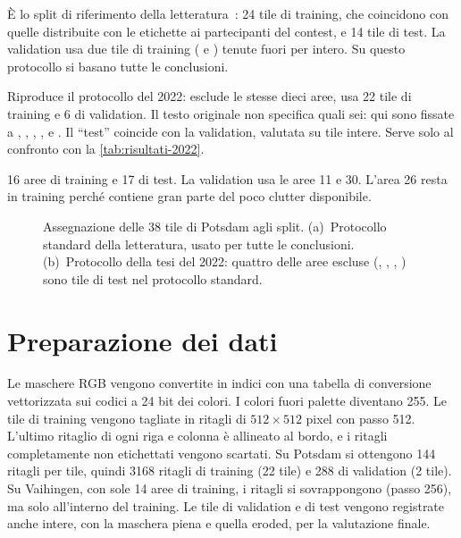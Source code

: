 \begin{description}[style=nextline, leftmargin=1.2em]
  \item[Potsdam \enquote{standard}.] È lo split di riferimento della
  letteratura~\cite{mmseg2020}: 24 tile di training, che coincidono con quelle distribuite con le
  etichette ai partecipanti del contest, e 14 tile di test. La validation usa due tile di
  training ( e ) tenute fuori per intero. Su questo protocollo si basano
  tutte le conclusioni.
  \item[Potsdam \enquote{tesi 2022}.] Riproduce il protocollo del 2022: esclude le stesse dieci
  aree, usa 22 tile di training e 6 di validation. Il testo originale non specifica quali sei:
  qui sono fissate a , , , ,  e
  . Il \enquote{test} coincide con la validation, valutata su tile intere. Serve solo
  al confronto con la \cref{tab:risultati-2022}.
  \item[Vaihingen \enquote{standard}.] 16 aree di training e 17 di test. La validation usa le
  aree 11 e 30. L'area 26 resta in training perché contiene gran parte del poco clutter
  disponibile.
\end{description}

\begin{figure}[t]
  \centering
  \resizebox{\linewidth}{!}{}
  \caption[Split delle tile di Potsdam]{Assegnazione delle 38 tile di Potsdam agli split.
    (a)~Protocollo standard della letteratura, usato per tutte le conclusioni. (b)~Protocollo
    della tesi del 2022: quattro delle aree escluse (, , ,
    ) sono tile di test nel protocollo standard.}
  \label{fig:split}
\end{figure}

\section{Preparazione dei dati}
\label{sec:preparazione}

Le maschere RGB vengono convertite in indici con una tabella di conversione vettorizzata sui
codici a 24 bit dei colori. I colori fuori palette diventano 255. Le tile di training vengono
tagliate in ritagli di $512\times512$ pixel con passo 512. L'ultimo ritaglio di ogni riga e
colonna è allineato al bordo, e i ritagli completamente non etichettati vengono scartati. Su
Potsdam si ottengono 144 ritagli per tile, quindi \num{3168} ritagli di training (22 tile) e 288 di
validation (2 tile). Su Vaihingen, con sole 14 aree di training, i ritagli si sovrappongono
(passo 256), ma solo all'interno del training. Le tile di validation e di test vengono registrate
anche intere, con la maschera piena e quella eroded, per la valutazione finale.

